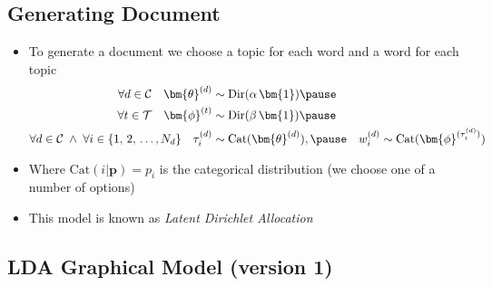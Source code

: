 
\begin{slide}
\section[-1]{Generating Document}

\begin{PauseHighLight}
  \begin{itemize}
  \item To generate a document we choose a topic for each word and a
    word for each topic\pause
    \begin{align*}
    \forall d\in\mathcal{C} \quad \bm{\theta}^{(d)}&\sim
    \mathrm{Dir}(\alpha\,\bm{1})\pause &&\\
    \forall t\in\mathcal{T} \quad \bm{\phi}^{(t)}&\sim
    \mathrm{Dir}(\beta\,\bm{1})\pause && \\
    \forall d\in\mathcal{C} \; \wedge\; \forall i\in\{1,\,2,\,\ldots, N_d\}
    \quad \tau^{(d)}_i &\sim \mathrm{Cat}(\bm{\theta}^{(d)}),\pause &
    w^{(d)}_i &\sim \mathrm{Cat}(\bm{\phi}^{(\tau^{(d)}_i)})
  \end{align*}
\item Where $\mathrm{Cat}(i|\bm{p}) = p_i$ is the categorical
  distribution (we choose one of a number of options)\pause
\item This model is known as \emph{Latent Dirichlet Allocation}\pause
  \end{itemize}
\end{PauseHighLight}

\end{slide}



\begin{slide}
\section[-2]{LDA Graphical Model (version 1)}

\pb\pause{}
\begin{center}
  \pause
\end{center}
\end{slide}


